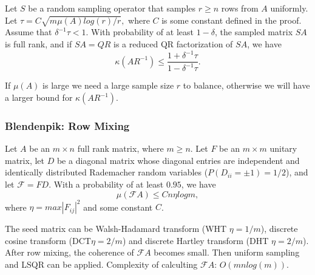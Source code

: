 

\begin{theorem}
Let $S$ be a random sampling operator that samples $r \geq n$ rows from $A$ uniformly. Let $\tau = C \sqrt{m \mu(A) log(r) /r},$
where $C$ is some constant defined in the proof. Assume that $\delta^{-1} \tau <1$. With probability of at least $1 - \delta$, the sampled matrix $SA$ is full rank, and if $SA = QR$ is a reduced QR factorization of $SA$, we have
$$
\kappa(A R^{-1}) \leq \frac{1 + \delta^{-1} \tau}{1 - \delta^{-1} \tau}.
$$
\end{theorem}
If $\mu(A)$ is large we need a large sample size $r$ to balance, otherwise we will have a larger bound for $\kappa(A R^{-1}).$

\subsubsection{Blendenpik: Row Mixing}
\begin{theorem}
Let $A$ be an $m \times n$ full rank matrix, where $m \geq n$. Let $F$ be an $m \times m$ unitary matrix, let $D$ be a diagonal matrix whose diagonal entries are independent and identically distributed Rademacher random variables ($P(D_{ii} = \pm 1 ) = 1/2$), and let $\mathcal{F} = FD$. With a probability of at least $0.95$, we have
$$
\mu(\mathcal{F} A) \leq C n \eta log m,
$$
where $\eta = max | F_{ij} |^2$ and some constant $C$.
\end{theorem}

The seed matrix can be Walsh-Hadamard transform (WHT {\color{red}$\eta = 1/m$}), discrete cosine transform (DCT{\color{red}$\eta = 2/m$}) and discrete Hartley transform (DHT {\color{red} $\eta = 2/m$}). After row mixing, the coherence of $\mathcal{F} A$ becomes small. Then uniform sampling and LSQR can be applied. Complexity of calculting $\mathcal{F}A$: $O(mn log(m)).$

